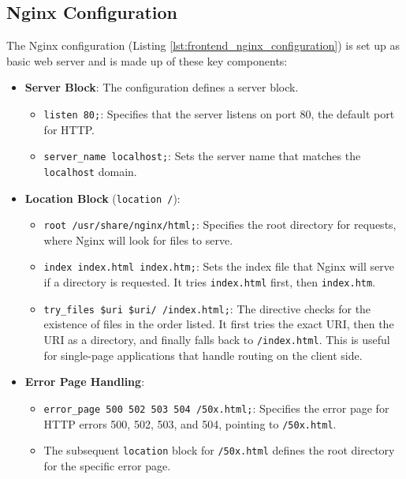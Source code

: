 \subsection{Nginx Configuration}

The Nginx configuration (Listing \ref{lst:frontend_nginx_configuration}) is set up as basic web server and is made up of these key components:

\begin{itemize}
    \item \textbf{Server Block}: The configuration defines a server block.
    \begin{itemize}
        \item \texttt{listen 80;}: Specifies that the server listens on port 80, the default port for HTTP.
        \item \texttt{server\_name localhost;}: Sets the server name that matches the \texttt{localhost} domain.
    \end{itemize}
    \item \textbf{Location Block} (\texttt{location /}):
    \begin{itemize}
        \item \texttt{root /usr/share/nginx/html;}: Specifies the root directory for requests, where Nginx will look for files to serve.
        \item \texttt{index index.html index.htm;}: Sets the index file that Nginx will serve if a directory is requested. It tries \texttt{index.html} first, then \texttt{index.htm}.
        \item \texttt{try\_files \$uri \$uri/ /index.html;}: The directive checks for the existence of files in the order listed. It first tries the exact URI, then the URI as a directory, and finally falls back to \texttt{/index.html}. This is useful for single-page applications that handle routing on the client side.
    \end{itemize}
    \item \textbf{Error Page Handling}:
    \begin{itemize}
        \item \texttt{error\_page 500 502 503 504 /50x.html;}: Specifies the error page for HTTP errors 500, 502, 503, and 504, pointing to \texttt{/50x.html}.
        \item The subsequent \texttt{location} block for \texttt{/50x.html} defines the root directory for the specific error page.
    \end{itemize}
\end{itemize}

